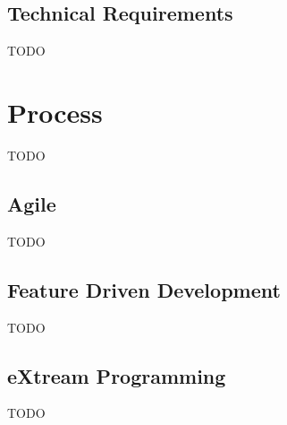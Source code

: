 \subsection{Technical Requirements}

{TODO}


\section{Process}

{TODO}

\subsection{Agile}

{TODO}

\subsection{Feature Driven Development}

{TODO}

\subsection{eXtream Programming}

{TODO}
